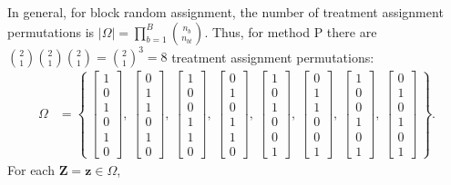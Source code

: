 \documentclass[
  12pt,
  leqno]{article}
\begin{document}
In general, for block random assignment, the number of treatment
assignment permutations is
\(\left| \Omega \right| = \prod \limits_{b = 1}^B {n_b \choose n_{bt}}\).
Thus, for method P there are
\({2 \choose 1}{2 \choose 1}{2 \choose 1} = {2 \choose 1}^3 = 8\)
treatment assignment permutations: \begin{align*}
\Omega & = \left\{ \ \begin{bmatrix} 1 \\ 0 \\ 1 \\ 0 \\ 1 \\ 0 \end{bmatrix}, \  \begin{bmatrix} 0 \\ 1 \\ 1 \\ 0 \\ 1 \\ 0 \end{bmatrix}, \ \begin{bmatrix} 1 \\ 0 \\ 0 \\ 1 \\ 1 \\ 0 \end{bmatrix}, \ \begin{bmatrix} 0 \\ 1 \\ 0 \\ 1 \\ 1 \\ 0 \end{bmatrix}, \ \begin{bmatrix} 1 \\ 0 \\ 1 \\ 0 \\ 0 \\ 1 \end{bmatrix}, \ \begin{bmatrix} 0 \\ 1 \\ 1 \\ 0 \\ 0 \\ 1 \end{bmatrix}, \ \begin{bmatrix} 1 \\ 0 \\ 0 \\ 1 \\ 0 \\ 1 \end{bmatrix}, \ \begin{bmatrix} 0 \\ 1 \\ 0 \\ 1 \\ 0 \\ 1 \end{bmatrix} \ \right\}.
\end{align*} For each \(\mathbf{Z} = \mathbf{z} \in \Omega\),
\end{document}
